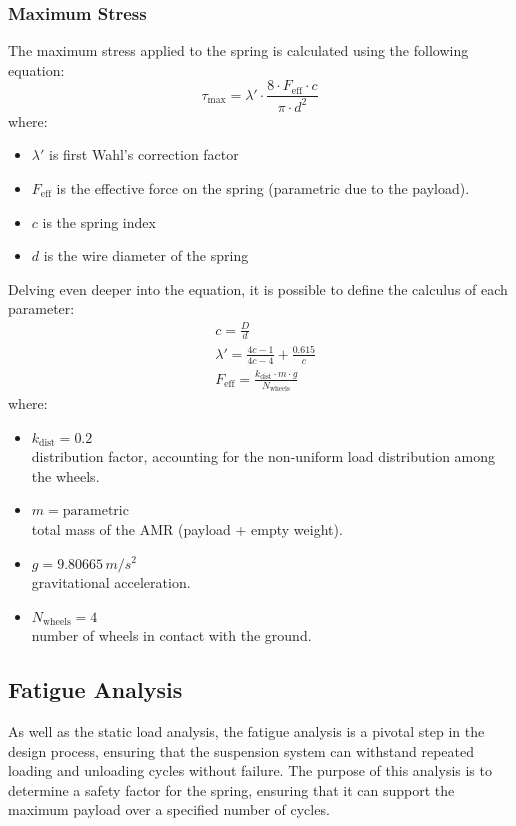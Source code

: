 \documentclass[11pt]{article}
\begin{document}
\subsubsection{Maximum Stress}
The maximum stress applied to the spring is calculated using the following equation:
\begin{equation}
    \tau_\text{max} = \lambda' \cdot \frac{8 \cdot F_\text{eff} \cdot c}{\pi \cdot d^2}
\end{equation}
where:
\begin{itemize}
    \item $\lambda'$ is first Wahl's correction factor
    \item \( F_\text{eff} \) is the effective force on the spring (parametric due to the payload).
    \item $c$ is the spring index
    \item $d$ is the wire diameter of the spring
\end{itemize}

\noindent
Delving even deeper into the equation, it is possible to define the calculus of each parameter:
\begin{align}
    & c = \frac{D}{d} \\[1em]
    & \lambda' = \frac{4c -1}{4c - 4} + \frac{0.615}{c} \\[1em]
    & F_\text{eff} = \frac{k_\text{dist} \cdot m \cdot g}{N_\text{wheels}}
\end{align}
where:
\begin{itemize}
    \item \( k_\text{dist} = 0.2\) \\ distribution factor, accounting for the non-uniform load distribution among the wheels.
    \item \( m = \text{parametric}\) \\ total mass of the AMR (payload + empty weight).
    \item \( g = 9.80665 \,m/s^2\) \\ gravitational acceleration.
    \item \( N_\text{wheels} = 4\) \\ number of wheels in contact with the ground.
\end{itemize}
\newpage

\subsection{Fatigue Analysis}
As well as the static load analysis, the fatigue analysis is a pivotal step in the design process, ensuring that the suspension system can withstand repeated loading and unloading cycles without failure. The purpose of this analysis is to determine a safety factor for the spring, ensuring that it can support the maximum payload over a specified number of cycles.
\end{document}
